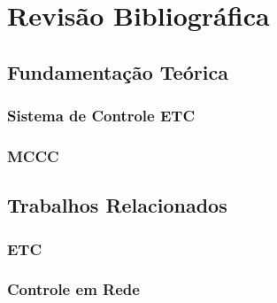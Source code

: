 \chapter{Revisão Bibliográfica} \label{cap2}
\section{Fundamentação Teórica}
\subsection{Sistema de Controle ETC}
\subsection{MCCC}

\section{Trabalhos Relacionados}
\subsection{ETC}
\subsection{Controle em Rede}
 
 
 
 
 
 
 
 
 
 
 